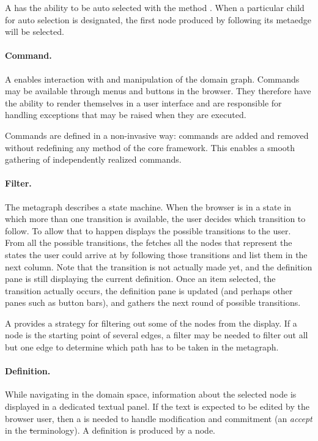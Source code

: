 \documentclass[a4paper,10pt,twoside]{book}
\begin{document}
A  has the ability to be auto selected with the method . When a particular child for auto selection is designated, the first node produced by following its metaedge will be selected.

\paragraph{Command.} A  enables interaction with and manipulation of the domain graph. Commands may be available through menus and buttons in the browser. They therefore have the ability to render themselves in a user interface and are responsible for handling exceptions that may be raised when they are executed. 

Commands are defined in a non-invasive way: commands are added and removed without redefining any method of the core framework. This enables a smooth gathering of independently realized commands.

\paragraph{Filter.} 
The metagraph describes a state machine. When the browser is in a state in which more than one transition is available, the user decides which transition to follow. To allow that to happen \ob displays the possible transitions  to the user. From all the possible transitions, the \obf fetches all the nodes that represent the states the user could arrive at by following those transitions and list them in the next column. Note that the transition is not actually made yet, and the definition pane is still displaying the current definition. Once an item selected, the transition  actually occurs, the definition pane is updated (and perhaps other panes such as button bars), and \ob gathers the next round of possible transitions.


A  provides a strategy for filtering out some of the nodes from the display. If a node is the starting point of several edges, a filter may be needed to filter out all but one edge to determine which path has to be taken in the metagraph. 

\paragraph{Definition.} While navigating in the domain space, information about the selected node is displayed in a dedicated textual panel. If the text is expected to be edited by the browser user, then a  is needed to handle modification and commitment (\ie an \emph{accept} in the \st terminology). A definition is produced by a node. 
\end{document}
